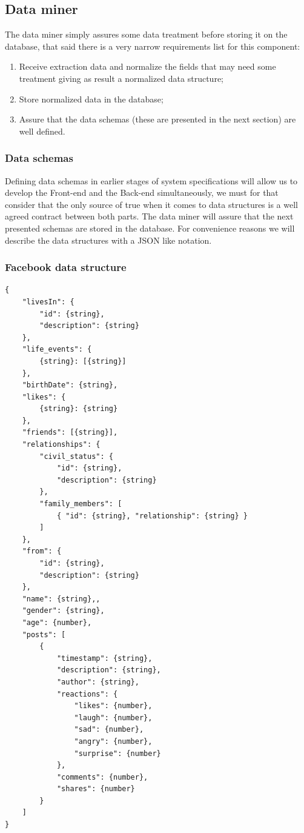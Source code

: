 \clearpage

\subsection{Data miner}
The data miner simply assures some data treatment before storing it on the database, that said there is a very narrow requirements list for this component:
\begin{enumerate}
\item Receive extraction data and normalize the fields that may need some treatment giving as result a normalized data structure;
\item Store normalized data in the database;
\item Assure that the data schemas (these are presented in the next section) are well defined.
\end{enumerate}

\subsubsection{Data schemas}
Defining data schemas in earlier stages of system specifications will allow us to develop the Front-end and the Back-end simultaneously, we must for that consider that the only source of true when it comes to data structures is a well agreed contract between both parts. The data miner will assure that the next presented schemas are stored in the database. For convenience reasons we will describe the data structures with a JSON like notation.

\subsubsection{Facebook data structure}
\begin{verbatim}
{
    "livesIn": {
        "id": {string},
        "description": {string}
    },
    "life_events": {
        {string}: [{string}]
    },
    "birthDate": {string},
    "likes": {
        {string}: {string}
    },
    "friends": [{string}],
    "relationships": {
        "civil_status": {
            "id": {string},
            "description": {string}
        },
        "family_members": [
            { "id": {string}, "relationship": {string} }
        ]
    },
    "from": {
        "id": {string},
        "description": {string}
    },
    "name": {string},,
    "gender": {string},
    "age": {number},
    "posts": [
        {
            "timestamp": {string},
            "description": {string},
            "author": {string},
            "reactions": {
                "likes": {number},
                "laugh": {number},
                "sad": {number},
                "angry": {number},
                "surprise": {number}
            },
            "comments": {number},
            "shares": {number}
        }
    ]
}
\end{verbatim}

